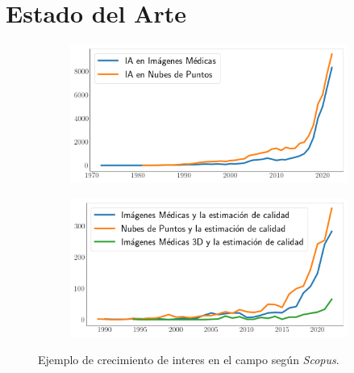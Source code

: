 \chapter{Estado del Arte}
\label{sec:EstadoDelArte}

\begin{figure}[htp]
  \centering
  \begin{subfigure}{0.47\textwidth}
    \includegraphics[width=\textwidth]{imagenes/chapter3/ScopusMLinMedicineAndPC.png}
  \end{subfigure}
  \begin{subfigure}{0.47\textwidth}
    \includegraphics[width=\textwidth]{imagenes/chapter3/ScopusQualityAssessment.png}
  \end{subfigure}
  \caption{Ejemplo de crecimiento de interes en el campo según \emph{Scopus}\footnotemark[1].
  }
  \label{fig:ScopusMLinMedicalAndPC}
\end{figure}



